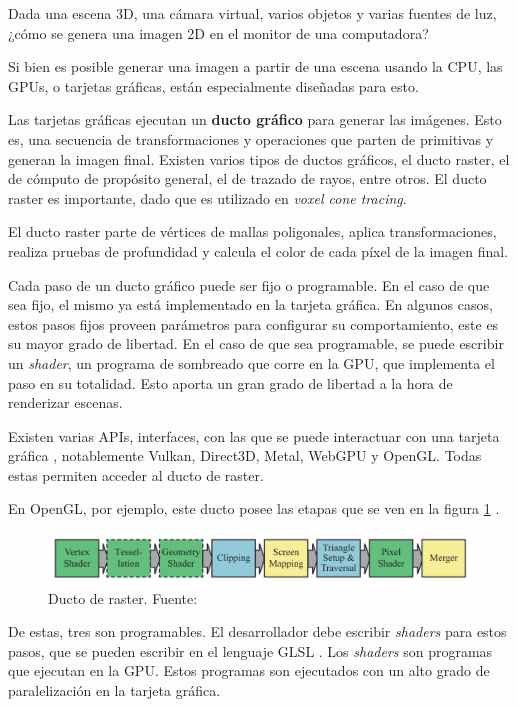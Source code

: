 Dada una escena 3D, una cámara virtual, varios objetos y varias fuentes de luz, ¿cómo se genera una imagen 2D en el monitor de una computadora?

Si bien es posible generar una imagen a partir de una escena usando la CPU, las GPUs, o tarjetas gráficas, están especialmente diseñadas para esto.

Las tarjetas gráficas ejecutan un \textbf{ducto gráfico} para generar las imágenes.
Esto es, una secuencia de transformaciones y operaciones que parten de primitivas y generan la imagen final.
Existen varios tipos de ductos gráficos, el ducto raster, el de cómputo de propósito general, el de trazado de rayos, entre otros.
El ducto raster es importante, dado que es utilizado en \textit{voxel cone tracing}.

El ducto raster parte de vértices de mallas poligonales, aplica transformaciones, realiza pruebas de profundidad y calcula el color de cada píxel de la imagen final.

Cada paso de un ducto gráfico puede ser fijo o programable.
En el caso de que sea fijo, el mismo ya está implementado en la tarjeta gráfica.
En algunos casos, estos pasos fijos proveen parámetros para configurar su comportamiento, este es su mayor grado de libertad.
En el caso de que sea programable, se puede escribir un \textit{shader}, un programa de sombreado que corre en la GPU, que implementa el paso en su totalidad.
Esto aporta un gran grado de libertad a la hora de renderizar escenas.

Existen varias APIs, interfaces, con las que se puede interactuar con una tarjeta gráfica \cite{comparison-graphics-apis}, notablemente Vulkan, Direct3D, Metal, WebGPU y OpenGL.
Todas estas permiten acceder al ducto de raster.

En OpenGL, por ejemplo, este ducto posee las etapas que se ven en la figura \ref{fig:raster-pipeline} \cite{rtr}.

\begin{figure}[h!]
    \centering
    \includegraphics[width=\textwidth]{raster-pipeline.png}
    \caption{Ducto de raster. Fuente: \cite{rtr}}
    \label{fig:raster-pipeline}
\end{figure}

De estas, tres son programables.
El desarrollador debe escribir \textit{shaders} para estos pasos, que se pueden escribir en el lenguaje GLSL \cite{glsl-spec}.
Los \textit{shaders} son programas que ejecutan en la GPU.
Estos programas son ejecutados con un alto grado de paralelización en la tarjeta gráfica.

